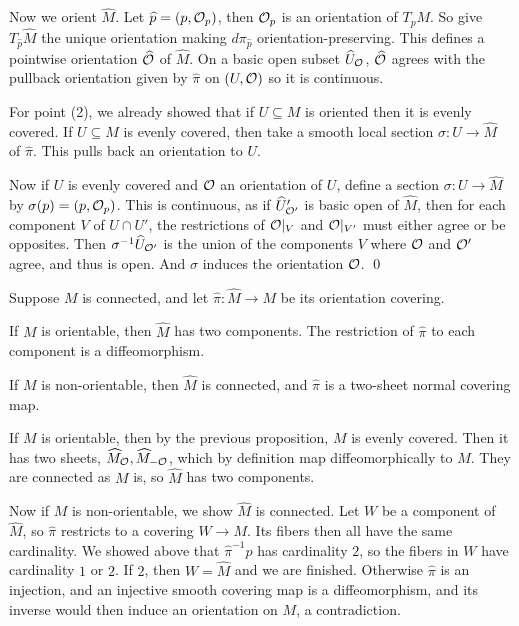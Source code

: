     Now we orient $\hat M$.
    Let $\widehat p=(p,{{\cal O}}_p)$, then ${{\cal O}}_p$ is an orientation of $T_pM$.
    So give $T_{\hat p}\hat M$ the unique orientation making $d\pi_{\hat p}$ orientation-preserving.
    This defines a pointwise orientation $\widehat{{{\cal O}}}$ of $\hat M$.
    On a basic open subset $\widehat U_{{\cal O}}$, $\widehat{{{\cal O}}}$ agrees with the pullback orientation given by $\hat\pi$ on $(U,{{\cal O}})$
    so it is continuous.

    For point (2), we already showed that if $U\subseteq M$ is oriented then it is evenly covered.
    If $U\subseteq M$ is evenly covered, then take a smooth local section $\sigma\colon U\to\hat M$ of $\hat\pi$.
    This pulls back an orientation to $U$.

    Now if $U$ is evenly covered and ${{\cal O}}$ an orientation of $U$, define a section $\sigma\colon U\to\hat M$ by
    $\sigma(p)=(p,{{\cal O}}_p)$.
    This is continuous, as if $\widehat U'_{{{\cal O}}'}$ is basic open of $\hat M$, then for each component $V$ of $U\cap U'$,
    the restrictions of ${{\cal O}}|_V$ and ${{\cal O}}|_{V'}$ must either agree or be opposites.
    Then $\sigma^{-1}\widehat U_{{{\cal O}}'}$ is the union of the components $V$ where ${{\cal O}}$ and ${{\cal O}}'$ agree, and thus is open.
    And $\sigma$ induces the orientation ${{\cal O}}$.
    \qed

\eproof

\bthrm

    Suppose $M$ is connected, and let $\hat\pi\colon\hat M\to M$ be its orientation covering.
    \benum
        \item If $M$ is orientable, then $\hat M$ has two components.
        The restriction of $\hat\pi$ to each component is a diffeomorphism.
        \item If $M$ is non-orientable, then $\hat M$ is connected, and $\hat\pi$ is a two-sheet normal covering map.
    \eenum

\ethrm

\bproof

    If $M$ is orientable, then by the previous proposition, $M$ is evenly covered.
    Then it has two sheets, $\widehat M_{{\cal O}},\widehat M_{-{{\cal O}}}$, which by definition map diffeomorphically to $M$.
    They are connected as $M$ is, so $\hat M$ has two components.

    Now if $M$ is non-orientable, we show $\hat M$ is connected.
    Let $W$ be a component of $\hat M$, so $\hat\pi$ restricts to a covering $W\to M$.
    Its fibers then all have the same cardinality.
    We showed above that $\hat\pi^{-1}p$ has cardinality $2$, so the fibers in $W$ have cardinality $1$ or $2$.
    If $2$, then $W=\hat M$ and we are finished.
    Otherwise $\hat\pi$ is an injection, and an injective smooth covering map is a diffeomorphism, and its inverse
    would then induce an orientation on $M$, a contradiction.

